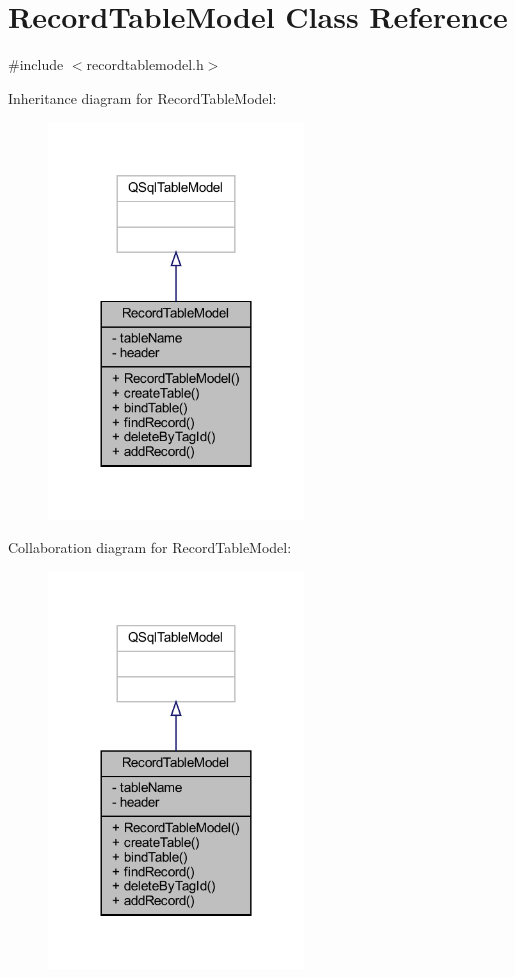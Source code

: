 \hypertarget{class_record_table_model}{}\section{Record\+Table\+Model Class Reference}
\label{class_record_table_model}


{\ttfamily \#include $<$recordtablemodel.\+h$>$}



Inheritance diagram for Record\+Table\+Model\+:
\nopagebreak
\begin{figure}[H]
\begin{center}
\leavevmode
\includegraphics[width=192pt]{class_record_table_model__inherit__graph}
\end{center}
\end{figure}


Collaboration diagram for Record\+Table\+Model\+:
\nopagebreak
\begin{figure}[H]
\begin{center}
\leavevmode
\includegraphics[width=192pt]{class_record_table_model__coll__graph}
\end{center}
\end{figure}
